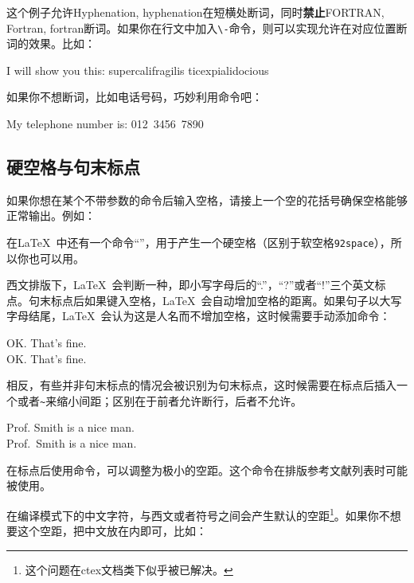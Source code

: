 这个例子允许Hyphenation, hyphenation在短横处断词，同时\textbf{禁止}FORTRAN, Fortran, fortran断词。如果你在行文中加入\verb|\-|命令，则可以实现允许在对应位置断词的效果。比如：

\begin{codeshow}
I will show you this:
su\-per\-cal\-i\-frag\-i\-lis\-%
tic\-ex\-pi\-al\-i\-do\-cious
\end{codeshow}

如果你不想断词，比如电话号码，巧妙利用命令吧：
\begin{latex}
My telephone number is: \mbox{012 3456 7890}
\end{latex}

\subsection{硬空格与句末标点}
如果你想在某个不带参数的命令后输入空格，请接上一个空的花括号确保空格能够正常输出。例如：

在\LaTeX\ 中还有一个命令“\texttt{\textvisiblespace}”，用于产生一个硬空格（区别于软空格\texttt{\char92space}），所以你也可以用。

西文排版下，\LaTeX\ 会判断一种，即小写字母后的“.”，“?”或者“!”三个英文标点。句末标点后如果键入空格，\LaTeX\ 会自动增加空格的距离。如果句子以大写字母结尾，\LaTeX\ 会认为这是人名而不增加空格，这时候需要手动添加命令：

\begin{codeshow}
OK. That's fine.\\
OK\@. That's fine.
\end{codeshow}

相反，有些并非句末标点的情况会被识别为句末标点，这时候需要在标点后插入一个\latexline{\textvisiblespace}或者\verb|~|来缩小间距；区别在于前者允许断行，后者不允许。

\begin{codeshow}
Prof. Smith is a nice man.\\
Prof.~Smith is a nice man.
\end{codeshow}

在标点后使用命令，可以调整为极小的空距。这个命令在排版参考文献列表时可能被使用。

在\xelatex 编译模式下的中文字符，与西文或者符号之间会产生默认的空距\footnote{这个问题在ctex文档类下似乎被已解决。}。如果你不想要这个空距，把中文放在内即可，比如：


